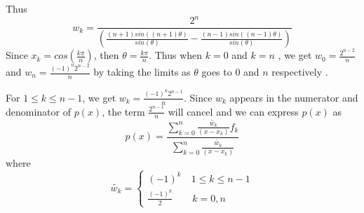 Thus
\[
w_{k} = \frac{2^{n}}{\left( \frac{(n+1)sin((n+1)\theta)}{sin(\theta)} - \frac{(n-1)sin((n-1)\theta)}{sin(\theta)}\right)}
\]
Since $x_{k} = cos(\frac{k\pi}{n})$, then $\theta = \frac{k\pi}{n}$. Thus when $k=0$ and $k=n$ , we get $w_{0}=\frac{2^{n-2}}{n}$ and $w_{n}=\frac{(-1)^{n}2^{n-2}}{n}$ by taking the limits as $\theta$ goes to $0$ and $n$ respectively \cite{doi:10.1093/comjnl/15.2.156}.

\noindent For $1\leq k \leq n-1$, we get $w_{k} = \frac{(-1)^{k}2^{n-1}}{n}$. Since $w_{k}$ appears in the numerator and denominator of $p(x)$,  the term $\frac{2^{n-1}}{n}$ will cancel and we can express $p(x)$ as 
\[
p(x) =\frac{\sum^{n}_{k=0}\frac{\tilde{w_{k}}}{(x-x_{k})}f_{k} }{\sum^{n}_{k=0}\frac{\tilde{w_{k}}}{(x-x_{k})}}
\]
where 
\[
\tilde{w_{k}} = 
\begin{cases}
(-1)^{k} \quad 1\leq k \leq n-1\\
\frac{(-1)^{k}}{2} \quad  \quad k=0,n
\end{cases}
\]
